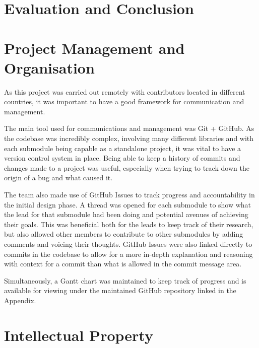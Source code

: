 \documentclass[a4paper]{article}
\begin{document}
\section{Evaluation and Conclusion}

\section{Project Management and Organisation}

As this project was carried out remotely
with contributors located in different countries, 
it was important to have a good framework for communication and management. 

The main tool used for communications and management was Git + GitHub.
As the codebase was incredibly complex, 
involving many different libraries and with each submodule being capable as a
standalone project, it was vital to have a version control system in place. 
Being able to keep a history of commits and changes made to a project was useful,
especially when trying to track down the origin of a bug and what caused it. 

The team also made use of GitHub Issues to track progress and accountability in 
the initial design phase. A thread was opened for each submodule to show what 
the lead for that submodule had been doing and potential avenues of achieving 
their goals. This was beneficial both for the leads to keep track of their 
research, but also allowed other members to contribute to other submodules 
by adding comments and voicing their thoughts. GitHub Issues were also linked 
directly to commits in the codebase to allow for a more in-depth explanation and
reasoning with context for a commit than what is allowed in the commit message 
area. 

Simultaneously, a Gantt chart was maintained to keep track of progress and is 
available for viewing under the maintained GitHub repository linked in the Appendix.

\section{Intellectual Property}

\end{document}
